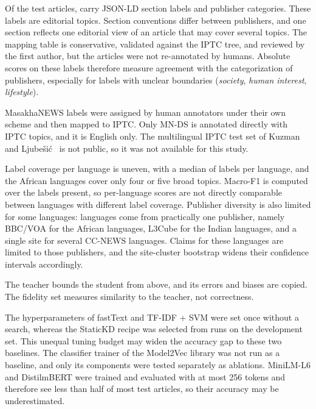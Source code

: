 Of the test articles,  carry JSON-LD section labels and  publisher categories. These labels are editorial topics. Section conventions differ between publishers, and one section reflects one editorial view of an article that may cover several topics. The mapping table is conservative, validated against the IPTC tree, and reviewed by the first author, but the articles were not re-annotated by humans. Absolute scores on these labels therefore measure agreement with the categorization of publishers, especially for labels with unclear boundaries (\emph{society}, \emph{human interest}, \emph{lifestyle}).

MasakhaNEWS labels were assigned by human annotators under their own scheme and then mapped to IPTC. Only MN-DS is annotated directly with IPTC topics, and it is English only. The multilingual IPTC test set of Kuzman and Ljube\v{s}i\'c~\cite{kuzman2025llm} is not public, so it was not available for this study.

Label coverage per language is uneven, with a median of  labels per language, and the African languages cover only four or five broad topics. Macro-F1 is computed over the labels present, so per-language scores are not directly comparable between languages with different label coverage. Publisher diversity is also limited for some languages:  languages come from practically one publisher, namely BBC/VOA for the African languages, L3Cube for the Indian languages, and a single site for several CC-NEWS languages. Claims for these languages are limited to those publishers, and the site-cluster bootstrap widens their confidence intervals accordingly.

The teacher bounds the student from above, and its errors and biases are copied. The fidelity set measures similarity to the teacher, not correctness.

The hyperparameters of fastText and TF-IDF + SVM were set once without a search, whereas the StaticKD recipe was selected from  runs on the development set. This unequal tuning budget may widen the accuracy gap to these two baselines. The classifier trainer of the Model2Vec library was not run as a baseline, and only its components were tested separately as ablations. MiniLM-L6 and DistilmBERT were trained and evaluated with at most 256 tokens and therefore see less than half of most test articles, so their accuracy may be underestimated.

